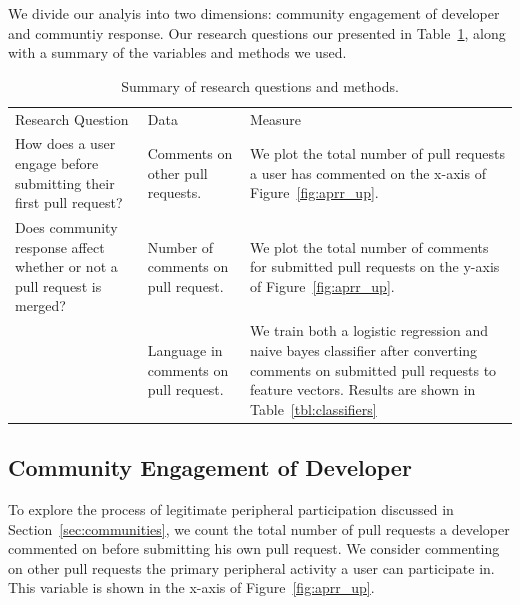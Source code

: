 \documentclass{sigchi}
\begin{document}
We divide our analyis into two dimensions: community engagement of developer and
communtiy response. Our research questions our presented in
Table~\ref{tbl:research_questions}, along with a summary of the variables and
methods we used.

\begin{table} \centering
\caption{Summary of research questions and methods.}
\label{tbl:research_questions}
\begin{tabular}{ p{3in} p{3in} p{2in} }
\hline\hline
Research Question
& Data                                  & Measure
\\
How does a user engage before submitting their first pull request?
& Comments on other pull requests.      & We plot the total number
of pull requests a user has commented on the x-axis of
Figure~\ref{fig:aprr_up}.
\\
Does community response affect whether or not a pull request is
merged? & Number of comments on pull request.   & We plot the
total number of comments for submitted pull requests on the
y-axis of Figure~\ref{fig:aprr_up}.
\\
~
& Language in comments on pull request. & We train both a
logistic regression and naive bayes classifier after
converting comments on submitted pull requests to feature
vectors. Results are shown in
Table~\ref{tbl:classifiers} \\
\hline
\end{tabular}
\end{table}

\subsection{Community Engagement of Developer}
To explore the process of legitimate peripheral participation discussed in
Section~\ref{sec:communities}, we count the total number of pull requests a
developer commented on before submitting his own pull request. We consider
commenting on other pull requests the primary peripheral activity a user can
participate in. This variable is shown in the x-axis of
Figure~\ref{fig:aprr_up}.
\end{document}

